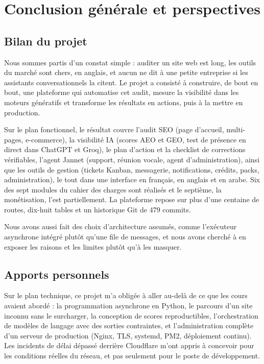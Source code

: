 \chapter*{Conclusion générale et perspectives}

\section*{Bilan du projet}
Nous sommes partis d'un constat simple : auditer un site web est long, les outils du marché sont chers, en anglais, et aucun ne dit à une petite entreprise si les assistants conversationnels la citent. Le projet \xapp{} a consisté à construire, de bout en bout, une plateforme qui automatise cet audit, mesure la visibilité dans les moteurs génératifs et transforme les résultats en actions, puis à la mettre en production.

Sur le plan fonctionnel, le résultat couvre l'audit SEO (page d'accueil, multi-pages, e-commerce), la visibilité IA (scores AEO et GEO, test de présence en direct dans ChatGPT et Groq), le plan d'action et la checklist de corrections vérifiables, l'agent Jannet (support, réunion vocale, agent d'administration), ainsi que les outils de gestion (tickets Kanban, messagerie, notifications, crédits, packs, administration), le tout dans une interface en français, en anglais et en arabe. Six des sept modules du cahier des charges sont réalisés et le septième, la monétisation, l'est partiellement. La plateforme repose sur plus d'une centaine de routes, dix-huit tables et un historique Git de 479 commits. 

Nous avons aussi fait des choix d'architecture assumés, comme l'exécuteur asynchrone intégré plutôt qu'une file de messages, et nous avons cherché à en exposer les raisons et les limites plutôt qu'à les masquer.

\section*{Apports personnels}

Sur le plan technique, ce projet m'a obligée à aller au-delà de ce que les cours avaient abordé : la programmation asynchrone en Python, le parcours d'un site inconnu sans le surcharger, la conception de scores reproductibles, l'orchestration de modèles de langage avec des sorties contraintes, et l'administration complète d'un serveur de production (Nginx, TLS, systemd, PM2, déploiement continu). Les incidents de délai dépassé derrière Cloudflare m'ont appris à concevoir pour les conditions réelles du réseau, et pas seulement pour le poste de développement.

